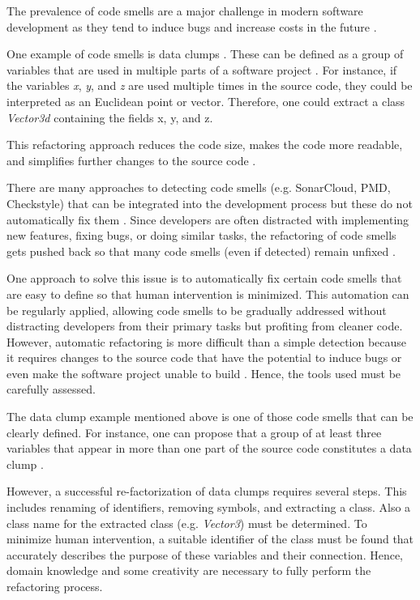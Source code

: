 \label{sec:introduction}
The prevalence of code smells are a major challenge  in modern software development as they tend to induce bugs and increase costs in the future \cite{mealyEvaluatingSoftwareRefactoring2006}.

One example of code smells is data clumps \cite{BaumgartnerAP23}. These can be defined as a group of variables that are used in multiple parts of a software project \cite{fowler2019refactoring}. For instance, if the variables \textit{x}, \textit{y}, and \textit{z} are used multiple times in the source code, they could be interpreted as an Euclidean point or vector. Therefore, one could extract  a class \textit{Vector3d} containing the fields x, y, and z. 

This refactoring approach reduces the code size, makes the code more readable, and simplifies further changes to the source code \cite{data_clumps_refactoring_guru} \cite{join_data_items}. 

There are many approaches to detecting code smells (e.g. SonarCloud,  PMD, Checkstyle) that can be integrated into the development process but these do not automatically fix them  \cite{vidalApproachPrioritizeCode2016}. 
Since developers are often distracted with implementing new features, fixing bugs, or doing similar tasks, the refactoring of code smells gets pushed back so that many code smells (even if detected) remain unfixed   \cite{10.1145/2393596.2393655 }.


One approach to solve this issue is to automatically fix certain code smells that are easy to define so that human intervention is minimized. This automation can be regularly applied, allowing code smells to be gradually addressed without distracting developers from their primary tasks but profiting from cleaner code. 
However,  automatic refactoring  is more difficult than a simple detection because it requires changes to the source code that have the potential to induce bugs or even make the software project unable to build \cite{9796303}. Hence, the tools used must be carefully assessed. 

The data clump example mentioned above is one of those code smells that can be clearly defined. For instance, one can propose that a group of at least three variables that appear in more than one part of the source code constitutes a data clump \cite{zhangImprovingPrecisionFowler2008}.




However, a successful re-factorization of data clumps requires several steps. This includes renaming of identifiers, removing symbols, and extracting a class. Also a class name for the extracted class (e.g. \textit{Vector3}) must be determined. To minimize human intervention, a suitable identifier of the class must be found that accurately describes the purpose of these variables and their connection. Hence, domain knowledge and some creativity are necessary to fully perform the refactoring process.

